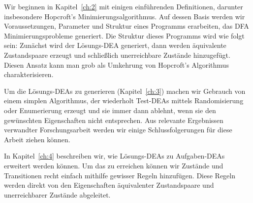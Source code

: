 Wir beginnen in Kapitel~\ref{ch:2} mit einigen einführenden Definitionen, darunter insbesondere Hopcroft's Minimierungsalgorithmus. Auf dessen Basis werden wir Voraussetzungen, Parameter und Struktur eines Programms erarbeiten, das DFA Minimierungsprobleme generiert. Die Struktur dieses Programms wird wie folgt sein: Zunächst wird der Lösungs-DEA generiert, dann werden äquivalente Zustandspaare erzeugt und schließlich unerreichbare Zustände hinzugefügt. Diesen Ansatz kann man grob als Umkehrung von Hopcroft's Algorithmus charakterisieren.

Um die Lösungs-DEAs zu generieren (Kapitel~\ref{ch:3}) machen wir Gebrauch von einem simplen Algorithmus, der wiederholt Test-DEAs mittels Randomisierung oder Enumerierung erzeugt und sie immer dann ablehnt, wenn sie den gewünschten Eigenschaften nicht entsprechen. Aus relevante Ergebnissen verwandter Forschungsarbeit werden wir einige Schlussfolgerungen für diese Arbeit ziehen können.

In Kapitel~\ref{ch:4} beschreiben wir, wie Lösungs-DEAs zu Aufgaben-DEAs erweitert werden können. Um das zu erreichen können wir Zustände und Transitionen recht einfach mithilfe gewisser Regeln hinzufügen. Diese Regeln werden direkt von den Eigenschaften äquivalenter Zustandspaare und unerreichbarer Zustände abgeleitet.
	